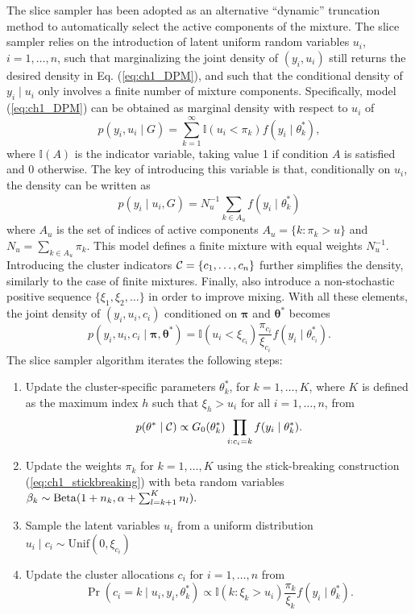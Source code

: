 The slice sampler \citep{walker2007, kalli2011} has been adopted as an alternative ``dynamic'' truncation method to automatically select the active components of the mixture. 
The slice sampler relies on the introduction of latent uniform random variables $u_i$, $i=1,\dots,n$, such that 
marginalizing the joint density of $(y_i,u_i)$ still returns the desired density in Eq. (\ref{eq:ch1_DPM}), and such that the conditional density of $y_i\mid u_i$ only involves a finite number of mixture components.
Specifically, model (\ref{eq:ch1_DPM}) can be obtained as marginal density with respect to $u_i$ of
\begin{equation*}
p(y_i,u_i\mid G) = \sum_{k=1}^{\infty} \mathbb{I}(u_i<\pi_k) f(y_i\mid\theta^*_k),
\end{equation*}
where $\mathbb{I}(A)$ is the indicator variable, taking value 1 if condition $A$ is satisfied and 0 otherwise. 
The key of introducing this variable is that, conditionally on $u_i$, the density can be written as
\begin{equation*}
p(y_i\mid u_i, G) = N_u^{-1} \sum_{k\in A_u} f(y_i\mid\theta^*_k)
\end{equation*}
where $A_u$ is the set of indices of active components $A_u = \{k:\pi_k >u\}$ and $N_u = \sum_{k\in A_u} \pi_k$. This model defines a finite mixture with equal weights $N_u^{-1}$.
Introducing the cluster indicators $\mathcal{C} = \{c_1,\dots,c_n\}$ further simplifies the density, similarly to the case of finite mixtures. Finally, \citet{kalli2011} also introduce a non-stochastic positive sequence $\{\xi_1,\xi_2,\dots\}$ in order to improve mixing. With all these elements, the joint density of $(y_i,u_i,c_i)$ conditioned on $\bm{\pi}$ and $\bm{\theta}^*$ becomes
\begin{equation*}
p(y_i,u_i,c_i \mid \bm{\pi},\bm{\theta}^*) =  \mathbb{I}(u_i < \xi_{c_i}) \frac{\pi_{c_i}}{\xi_{c_i}} f(y_i\mid\theta^*_{c_i}).
\end{equation*}
The slice sampler algorithm iterates the following steps:
\begin{enumerate}
	\item Update the cluster-specific parameters $\theta^*_k$, for $k=1,\dots,K$, where $K$ is defined as the maximum index $h$ such that $\xi_h > u_i$ for all $i=1,\dots,n$, from
	$$p(\theta^*\mid \mathcal{C}) \propto G_0(\theta^*_k)\prod_{i:c_i=k} f(y_i\mid\theta^*_k).$$
	\item Update the weights $\pi_k$ for $k=1,\dots,K$ using the stick-breaking construction (\ref{eq:ch1_stickbreaking}) with beta random variables $\beta_k\sim\mathrm{Beta}(1+n_k, \alpha + \sum_{l=k+1}^K n_l).$
	\item Sample the latent variables $u_i$ from a uniform distribution $u_i \mid c_i \sim \mathrm{Unif}(0,\xi_{c_i})$
	\item Update the cluster allocations $c_i$ for $i=1,\dots,n$ from
	$$\Pr(c_i = k\mid u_i, y_i, \theta^*_k)\propto \mathbb{I}(k:\xi_k > u_i) \frac{\pi_k}{\xi_k} f(y_i\mid\theta^*_k).$$
\end{enumerate}



